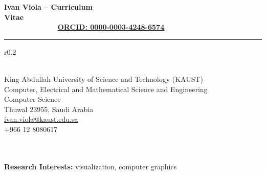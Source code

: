 \documentclass[a4paper,11pt]{letter}
\begin{document}
\noindent  \large{\textbf{Ivan Viola -- Curriculum Vitae~~~~~~~~~~~~~~~~~~~~~~~~~~~~~~~~~~~~~~~~~~~~~~~~~~~~~~~~~~~~~~~~~~~~~~\href{https://orcid.org/0000-0003-4248-6574/}{ORCID: 0000-0003-4248-6574}}} \\
\vspace{-2ex} 
\hrule 
\normalsize

\begin{wrapfigure}{r}{0.2\linewidth}
\centering
\setlength{\fboxsep}{0pt}%
\setlength{\fboxrule}{1pt}%
%
\end{wrapfigure}
~\\
King Abdullah University of Science and Technology (KAUST) \\
Computer, Electrical and Mathematical Science and Engineering \\ 
Computer Science \\
Thuwal 23955, Saudi Arabia \\
\href{mailto:ivan.viola@kaust.edu.sa}{ivan.viola@kaust.edu.sa} \\
+966 12 8080617\\
~


~\\

\textbf{Research Interests:} visualization, computer graphics\\
\end{document}
